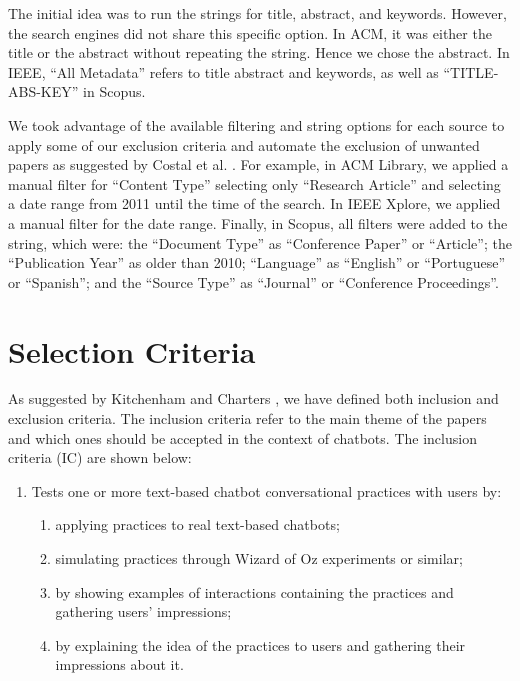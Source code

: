 The initial idea was to run the strings for title, abstract, and keywords. However, the search engines did not share this specific option. In ACM, it was either the title or the abstract without repeating the string. Hence we chose the abstract. In IEEE, ``All Metadata'' refers to title abstract and keywords, as well as ``TITLE-ABS-KEY'' in Scopus.
 
We took advantage of the available filtering and string options for each source to apply some of our exclusion criteria and automate the exclusion of unwanted papers as suggested by Costal et al. \cite{CostalFFQ21}. For example, in ACM Library, we applied a manual filter for ``Content Type'' selecting only ``Research Article'' and selecting a date range from 2011 until the time of the search. In IEEE Xplore, we applied a manual filter for the date range. Finally, in Scopus, all filters were added to the string, which were: the ``Document Type'' as ``Conference Paper'' or ``Article''; the ``Publication Year'' as older than 2010; ``Language'' as ``English'' or ``Portuguese'' or ``Spanish''; and the ``Source Type'' as ``Journal'' or ``Conference Proceedings''.

\section{Selection Criteria}\label{sec:criteria}

As suggested by Kitchenham and Charters \cite{barbara2007guidelines}, we have defined both inclusion and exclusion criteria. The inclusion criteria refer to the main theme of the papers and which ones should be accepted in the context of chatbots. The inclusion criteria (IC) are shown below:

\begin{enumerate}
    \item[(IC)] Tests one or more text-based chatbot conversational practices with users by:
    \begin{enumerate}
        \item[(1)] applying practices to real text-based chatbots; 
        \item[(2)] simulating practices through Wizard of Oz experiments or similar;
        \item[(3)] by showing examples of interactions containing the practices and gathering users' impressions;
        \item[(4)] by explaining the idea of the practices to users and gathering their impressions about it.
    \end{enumerate}
\end{enumerate}

